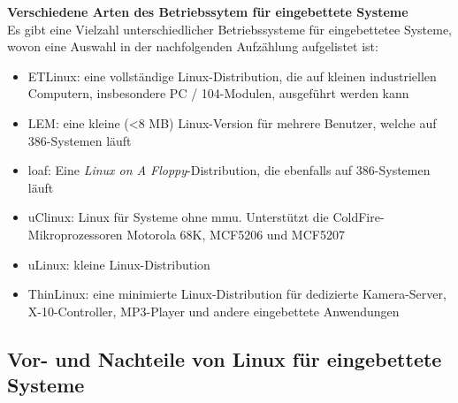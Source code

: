\textbf{Verschiedene Arten des Betriebssytem für eingebettete Systeme}\\
Es gibt eine Vielzahl unterschiedlicher Betriebssysteme für eingebettetee Systeme, wovon eine Auswahl in der nachfolgenden Aufzählung aufgelistet ist:\cite{ibm}
\begin{itemize}
  \item ETLinux: eine vollständige Linux-Distribution, die auf kleinen industriellen Computern, insbesondere PC / 104-Modulen, ausgeführt werden kann
  \item LEM: eine kleine (<8 MB) Linux-Version für mehrere Benutzer, welche auf 386-Systemen läuft
  \item \ac{loaf}: Eine \emph{Linux on A Floppy}-Distribution, die ebenfalls auf 386-Systemen läuft
  \item uClinux: Linux für Systeme ohne \ac{mmu}. Unterstützt die ColdFire-Mikroprozessoren Motorola 68K, MCF5206 und MCF5207
  \item uLinux: kleine Linux-Distribution
  \item ThinLinux: eine minimierte Linux-Distribution für dedizierte Kamera-Server, X-10-Controller, MP3-Player und andere eingebettete Anwendungen
\end{itemize}

\subsection{Vor- und Nachteile von Linux für eingebettete Systeme}\label{kap:vorundnachteilelinux}

